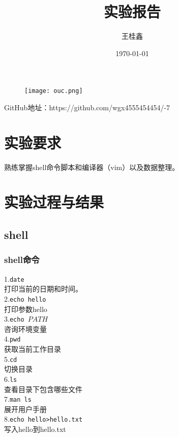\documentclass[a4paper,12pt]{article}
\begin{document}
  

 \begin{figure}
     \centering
     \texttt{[image: ouc.png]}
     \label{fig:enter-label}
 \end{figure}
 \title{实验报告}  
 \author{王桂鑫}  
 \date{\today}  
 \maketitle  
GitHub地址：https://github.com/wgx4555454454/-7
\section{\color{blue}实验要求}  
熟练掌握shell命令脚本和编译器（vim）以及数据整理。  

\section{\color{red}实验过程与结果}  
\subsection{shell} 
\subsubsection{shell命令}
1.\texttt{date}\\
打印当前的日期和时间。\\

2.\texttt{echo hello}\\
打印参数hello\\

3.\texttt{echo $PATH$}\\
咨询环境变量\\

4.\texttt{pwd}\\
获取当前工作目录\\

5.\texttt{cd}\\
切换目录\\

6.\texttt{ls}\\
查看目录下包含哪些文件\\

7.\texttt{man ls}\\
展开用户手册\\

8.\texttt{echo hello>hello.txt}\\
写入hello到hello.txt\\
\end{document}
